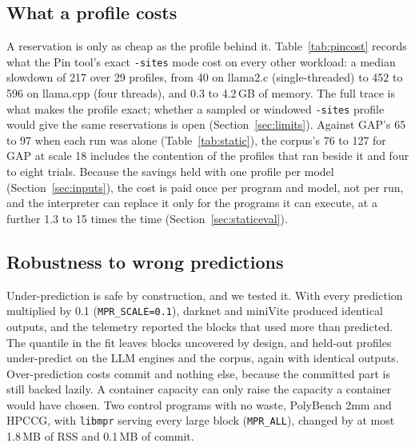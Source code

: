 \documentclass[11pt]{article}
\newcommand{\libmpr}{\texttt{libmpr}}
\newcommand{\secref}[1]{Section~\ref{#1}}
\newcommand{\tabref}[1]{Table~\ref{#1}}
\begin{document}
\subsection{What a profile costs}
\label{sec:cost}

\begin{table}[t]
\centering\small
\resizebox{\linewidth}{!}{}
\caption{The Pin tool's exact \texttt{-sites} profile on the workloads the interpreter cannot run or that we profiled
only under Pin: the corpus's largest inputs and the LLM profiles, against the same input's native run under glibc.
The corpus profiles ran several at a time, so their times are upper bounds.}
\label{tab:pincost}
\end{table}

A reservation is only as cheap as the profile behind it. \tabref{tab:pincost} records what the Pin tool's exact
\texttt{-sites} mode cost on every other workload: a median slowdown of 217 over 29 profiles, from 40 on llama2.c
(single-threaded) to 452 to 596 on llama.cpp (four threads), and 0.3 to 4.2\,GB of memory. The full trace is what makes the profile exact; whether a sampled or
windowed \texttt{-sites} profile would give the same reservations is open (\secref{sec:limits}). Against GAP's 65 to
97 when each run was alone (\tabref{tab:static}), the corpus's 76 to 127 for GAP at scale 18 includes the
contention of the profiles that ran beside it and four to eight trials. Because the savings held with one profile
per model (\secref{sec:inputs}), the cost is paid once per program and model, not per run, and the interpreter can
replace it only for the programs it can execute, at a further 1.3 to 15 times the time (\secref{sec:staticeval}).

\subsection{Robustness to wrong predictions}
\label{sec:robust}

Under-prediction is safe by construction, and we tested it. With every prediction multiplied by 0.1
(\texttt{MPR\_SCALE=0.1}), darknet and miniVite produced identical outputs, and the telemetry reported the
blocks that used more than predicted. The quantile in the fit leaves blocks uncovered by design, and held-out
profiles under-predict on the LLM engines and the corpus, again with identical outputs. Over-prediction costs
commit and nothing else, because the committed part is still backed lazily. A container capacity can only raise
the capacity a container would have chosen. Two control programs with no waste, PolyBench 2mm and HPCCG, with
\libmpr{} serving every large block (\texttt{MPR\_ALL}), changed by at most 1.8\,MB of RSS and 0.1\,MB of commit.
\end{document}
